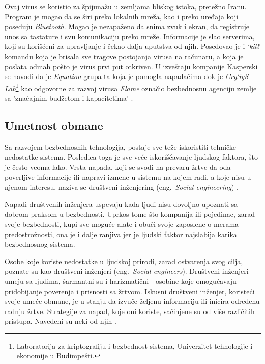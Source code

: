\documentclass[a4paper]{article}
\begin{document}
Ovaj virus se koristio za špijunažu u zemljama bliskog istoka, pretežno Iranu. Program je mogao da se širi preko lokalnih mreža, kao i preko uređaja koji poseduju {\em Bluetooth}. Mogao je nezapaženo da snima zvuk i ekran, da registruje unos sa tastature i svu komunikaciju preko mreže. Informacije je slao serverima, koji su korišćeni za upravljanje i čekao dalja uputstva od njih. Posedovao je i ‘\textit{kill}’ komandu koja je brisala sve tragove postojanja virusa na računaru, a koja je poslata odmah pošto je virus prvi put otkriven. U izveštaju kompanije Kasperski se navodi da je \textit{Equation} grupa ta koja je pomogla napadačima dok je \textit{CrySyS Lab}\footnote{ Laboratorija za kriptografiju i bezbednost sistema, Univerzitet tehnologije i ekonomije u Budimpešti.} kao odgovorne za razvoj virusa \textit{Flame} označio bezbednosnu agenciju zemlje sa 'značajnim budžetom i kapacitetima' \cite{flame}.

\subsection{Umetnost obmane}
\label{deception}

Sa razvojem bezbednosnih tehnologija, postaje sve teže
iskoristiti tehničke nedostatke sistema.
Posledica toga je sve veće iskorišćavanje ljudskog
faktora, što je često veoma lako. Vrsta napada, koji se
svodi na prevaru žrtve da oda poverljive informacije ili
napravi izmene u sistemu na kojem radi, a koje nisu u
njenom interesu, naziva se društveni inženjering
(eng.~{\em Social engineering}) \cite{deception}.

Napadi društvenih inženjera uspevaju kada ljudi nisu dovoljno upoznati sa dobrom praksom u bezbednosti. Uprkos tome što kompanija ili pojedinac, zarad svoje bezbednosti, kupi sve moguće alate i obuči svoje zaposlene o merama predostrožnosti, ona je i dalje ranjiva jer je ljudski faktor najslabija karika bezbednosnog sistema.

Osobe koje koriste nedostatke u ljudskoj prirodi, zarad ostvarenja svog cilja, poznate su kao društveni inženjeri (eng.~{\em Social engineers}). Društveni inženjeri umeju sa ljudima, šarmantni su i harizmatični - osobine koje omogućavaju pridobijanje poverenja i prisnosti sa žrtvom. Iskusni društveni inženjer, koristeći svoje umeće obmane, je u stanju da izvuče željenu informaciju ili inicira određenu radnju žrtve. Strategije za napad, koje oni koriste, sačinjene su od više različitih pristupa. Navedeni su neki od njih \cite{deception}.
\end{document}
